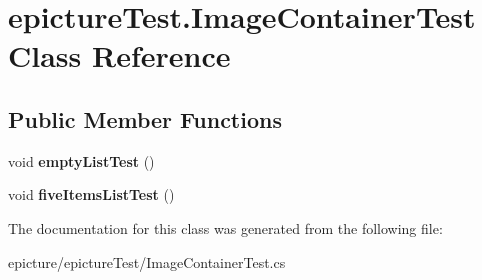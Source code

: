 \hypertarget{classepicture_test_1_1_image_container_test}{}\section{epicture\+Test.\+Image\+Container\+Test Class Reference}
\label{classepicture_test_1_1_image_container_test}
\subsection*{Public Member Functions}
\begin{DoxyCompactItemize}
\item 
\mbox{\label{classepicture_test_1_1_image_container_test_ae98f92baeb2a6b5b6a00ec4d391574b7}} 
void {\bfseries empty\+List\+Test} ()
\item 
\mbox{\label{classepicture_test_1_1_image_container_test_ac4bc137644c112217b02114a7088763c}} 
void {\bfseries five\+Items\+List\+Test} ()
\end{DoxyCompactItemize}


The documentation for this class was generated from the following file\+:\begin{DoxyCompactItemize}
\item 
epicture/epicture\+Test/Image\+Container\+Test.\+cs\end{DoxyCompactItemize}

